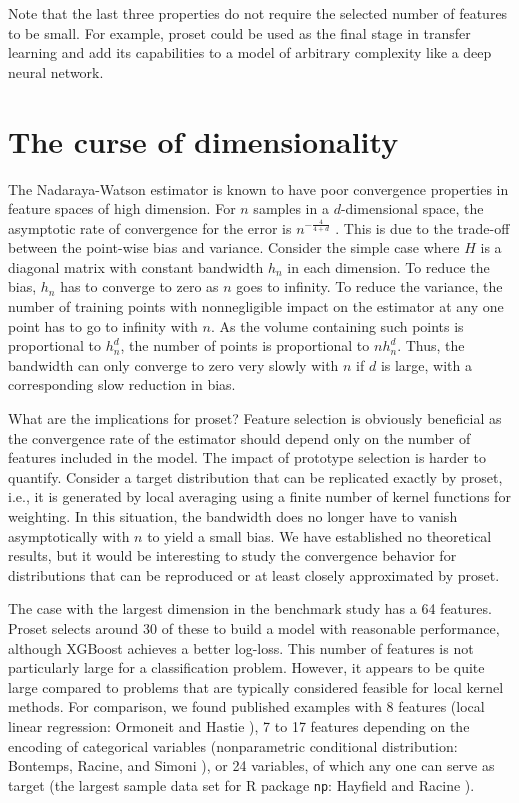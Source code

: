 %
Note that the last three properties do not require the selected number of features to be small.
For example, proset could be used as the final stage in transfer learning and add its capabilities to a model of arbitrary complexity like a deep neural network.
%
\section{The curse of dimensionality}
\label{sec_curse}
%
The Nadaraya-Watson estimator is known to have poor convergence properties in feature spaces of high dimension.
For $n$ samples in a $d$-dimensional space, the asymptotic rate of convergence for the error is $n^{-\frac{4}{4+d}}$ \cite{Haerdle_04}.
This is due to the trade-off between the point-wise bias and variance.
Consider the simple case where $H$ is a diagonal matrix with constant bandwidth $h_n$ in each dimension.
To reduce the bias, $h_n$ has to converge to zero as $n$ goes to infinity.
To reduce the variance, the number of training points with nonnegligible impact on the estimator at any one point has to go to infinity with $n$.
As the volume containing such points is proportional to $h_n^d$, the number of points is proportional to $nh_n^d$.
Thus, the bandwidth can only converge to zero very slowly with $n$ if $d$ is large, with a corresponding slow reduction in bias.\par
%
What are the implications for proset?
Feature selection is obviously beneficial as the convergence rate of the estimator should depend only on the number of features included in the model.
The impact of prototype selection is harder to quantify.
Consider a target distribution that can be replicated exactly by proset, i.e., it is generated by local averaging using a finite number of kernel functions for weighting.
In this situation, the bandwidth does no longer have to vanish asymptotically with $n$ to yield a small bias.
We have established no theoretical results, but it would be interesting to study the convergence behavior for distributions that can be reproduced or at least closely approximated by proset.\par
%
The case with the largest dimension in the benchmark study has a 64 features.
Proset selects around 30 of these to build a model with reasonable performance, although XGBoost achieves a better log-loss.
This number of features is not particularly large for a classification problem.
However, it appears to be quite large compared to problems that are typically considered feasible for local kernel methods.
For comparison, we found published examples with 8 features (local linear regression: Ormoneit and Hastie \cite{Ormoneit_99}),
7 to 17 features depending on the encoding of categorical variables (nonparametric conditional distribution: Bontemps, Racine, and Simoni \cite{Bontemps_09}),
or 24 variables, of which any one can serve as target (the largest sample data set for R package \texttt{np}: Hayfield and Racine \cite{Hayfield_08}).
%
